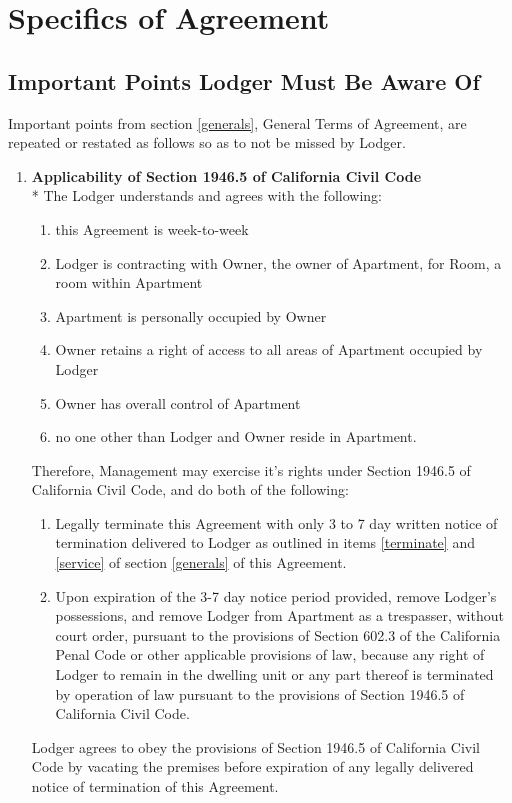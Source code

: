\documentclass[12pt,letterpaper]{article}
\newcommand{\lodger}{Lodger}
\newcommand{\generals}{General Terms of Agreement}
\newcommand{\specifics}{Specifics of Agreement}
\newcommand{\management}{Management}
\newcommand{\apt}{Apartment}
\newcommand{\room}{Room}
\begin{document}
\newpage
\section{\specifics{}} \label{specifics} 
\subsection{Important Points \lodger{} Must Be Aware Of}
	Important points from section \ref{generals}, \generals{}, are repeated or restated as follows so as to not be missed by \lodger{}.
	\begin{enumerate}
		\item \textbf{Applicability of Section 1946.5 of California Civil Code}\\*
			The \lodger{} understands and agrees with the following:
			\begin{enumerate}
				\item this Agreement is week-to-week
				\item \lodger{} is contracting with Owner, the owner of \apt{}, for \room{}, a room within \apt{}
				\item \apt{} is personally occupied by Owner
				\item Owner retains a right of access to all areas of \apt{} occupied by \lodger{} 
				\item Owner has overall control of \apt{} 
				\item no one other than \lodger{} and Owner reside in \apt{}. 
			\end{enumerate}
			Therefore, \management{} may exercise it's rights under Section 1946.5 of California Civil Code, and do both of the following: 
			\begin{enumerate}
				\item Legally terminate this Agreement with only 3 to 7 day written notice of termination delivered to \lodger{} as outlined in items \ref{terminate} and \ref{service} of section \ref{generals} of this Agreement.
				\item Upon expiration of the 3-7 day notice period provided, remove \lodger{}'s possessions, and remove \lodger{} from \apt{} as a trespasser, without court order, pursuant to the provisions of Section 602.3 of the California Penal Code or other applicable provisions of law, because any right of \lodger{} to remain in the dwelling unit or any part thereof is terminated by operation of law pursuant to the provisions of Section 1946.5 of California Civil Code.
			\end{enumerate} 
			\lodger{} agrees to obey the provisions of Section 1946.5 of California Civil Code by vacating the premises before expiration of any legally delivered notice of termination of this Agreement.  
	

\end{enumerate}
\end{document}
